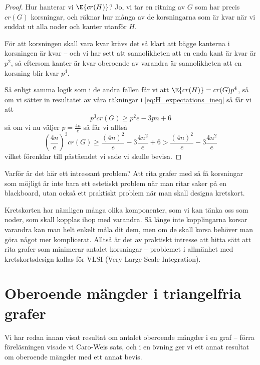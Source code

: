 \documentclass[nobib]{tufte-handout}
\begin{document}
\begin{theorem}
\begin{proof}
    Hur hanterar vi $\E{cr(H)}$? Jo, vi tar en ritning av $G$ som har precis $cr(G)$ korsningar, och räknar hur många av de korsningarna som är kvar när vi suddat ut alla noder och kanter utanför $H$.

    För att korsningen skall vara kvar krävs det så klart att bägge kanterna i korsningen är kvar -- och vi har sett att sannolikheten att en enda kant är kvar är $p^2$, så eftersom kanter är kvar oberoende av varandra är sannolikheten att en korsning blir kvar $p^4$.

    Så enligt samma logik som i de andra fallen får vi att $\E{cr(H)} = cr(G)p^4$, så om vi sätter in resultatet av våra räkningar i \eqref{eq:H_expectations_ineq} så får vi att
    $$p^3cr(G) \geq p^2e - 3pn + 6$$
    så om vi nu väljer $p = \frac{4n}{e}$ så får vi alltså
    $$\left(\frac{4n}{e}\right)^3cr(G) \geq \frac{(4n)^2}{e} - 3\frac{4n^2}{e} + 6 > \frac{(4n)^2}{e} - 3\frac{4n^2}{e}$$
    vilket förenklar till påståendet vi sade vi skulle bevisa.
  \end{proof}
\end{theorem}

Varför är det här ett intressant problem? Att rita grafer med så få korsningar som möjligt är inte bara ett estetiskt problem när man ritar saker på en blackboard, utan också ett praktiskt problem när man skall designa kretskort.

Kretskorten har nämligen många olika komponenter, som vi kan tänka oss som noder, som skall kopplas ihop med varandra. Så länge inte kopplingarna korsar varandra kan man helt enkelt måla dit dem, men om de skall korsa behöver man göra något mer komplicerat. Alltså är det av praktiskt intresse att hitta sätt att rita grafer som minimerar antalet korsningar -- problemet i allmänhet med kretskortsdesign kallas för VLSI (Very Large Scale Integration).

\section{Oberoende mängder i triangelfria grafer}

Vi har redan innan visat resultat om antalet oberoende mängder i en graf -- förra föreläsningen visade vi Caro-Weis sats, och i en övning ger vi ett annat resultat om oberoende mängder med ett annat bevis.
\end{document}
